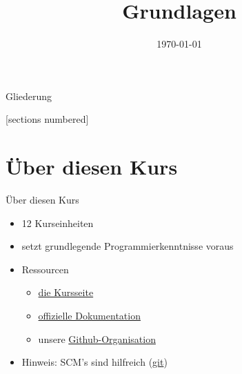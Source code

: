



\title{Grundlagen}
\date{\today}




\maketitle

\begin{frame}{Gliederung}
	\begin{multicols}{2}
		[sections numbered]
		\tableofcontents
	\end{multicols}
\end{frame}

\section{Über diesen Kurs}
\begin{frame}{Über diesen Kurs}
	\begin{itemize}
    	\item 12 Kurseinheiten
    	\item setzt grundlegende Programmierkenntnisse voraus
    	\item Ressourcen
    	\begin{itemize}
    	    \item \href{https://kurse.ifsr.de/}{die Kursseite} %
    	    \item \href{docs.python.org}{offizielle Dokumentation}
    	    \item unsere \href{https://github.com/fsr}{Github-Organisation}
    	\end{itemize}
    	\item Hinweis: SCM's sind hilfreich (\href{https://git-scm.com}{git})
	\end{itemize}
\end{frame}


